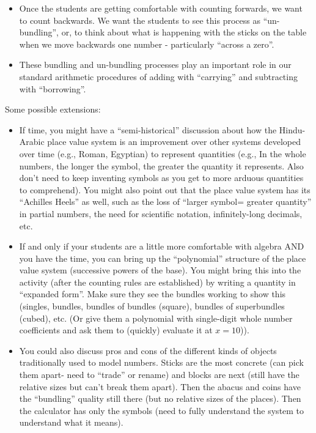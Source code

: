 \documentclass[nooutcomes,noauthor,handout]{ximera}
\begin{document}
\begin{instructorNotes}
\begin{itemize}
	\item Once the students are getting comfortable with counting forwards, we want to count backwards.  We want the students to see this process as ``un-bundling'', or, to think about what is happening with the sticks on the table when we move backwards one number - particularly ``across a zero''. 
	\item These bundling and un-bundling processes play an important role in our standard arithmetic procedures of adding with ``carrying'' and subtracting with ``borrowing''. 
\end{itemize}

Some possible extensions:

\begin{itemize}

    \item If time, you might have a ``semi-historical'' discussion about how the Hindu-Arabic place value system is an improvement over other systems developed over time (e.g., Roman, Egyptian) to represent quantities (e.g., In the whole numbers, the longer the symbol, the greater the quantity it represents.  Also don't need to keep inventing symbols as you get to more arduous quantities to comprehend).  You might also point out that the place value system has its ``Achilles Heels'' as well, such as the loss of ``larger symbol= greater quantity'' in partial numbers, the need for scientific notation, infinitely-long decimals, etc.  

     \item If and only if your students are a little more comfortable with algebra AND you have the time, you can bring up the ``polynomial'' structure of the place value system (successive powers of the base).  You might bring this into the activity (after the counting rules are established) by writing a quantity in ``expanded form''.  Make sure they see the bundles working to show this (singles, bundles, bundles of bundles (square), bundles of superbundles (cubed), etc. (Or give them a polynomial with single-digit whole number coefficients and ask them to (quickly) evaluate it at $x = 10$)).

     \item You could also discuss pros and cons of the different kinds of objects traditionally used to model numbers.  Sticks are the most concrete (can pick them apart- need to ``trade'' or rename) and blocks are next (still have the relative sizes but can't break them apart).  Then the abacus and coins have the ``bundling'' quality still there (but no relative sizes of the places).  Then the calculator has only the symbols (need to fully understand the system to understand what it means).
\end{itemize}


\end{instructorNotes}
\end{document}
